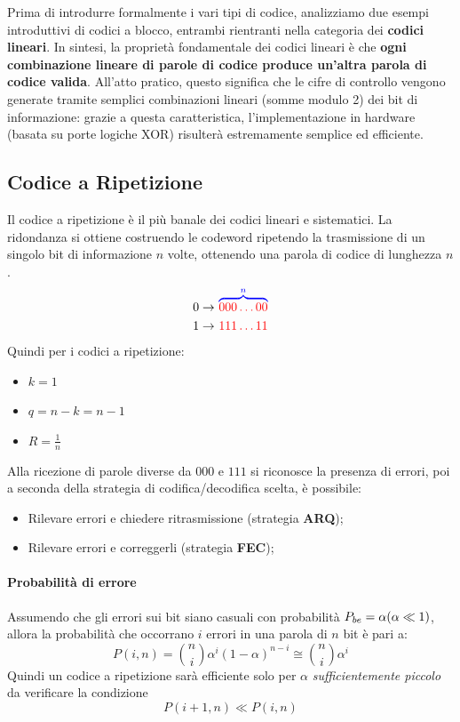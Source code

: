 Prima di introdurre formalmente i vari tipi di codice, analizziamo due esempi introduttivi di codici a blocco, entrambi rientranti nella categoria dei \textbf{codici lineari}. In sintesi, la proprietà fondamentale dei codici lineari è che \textbf{ogni combinazione lineare di parole di codice produce un'altra parola di codice valida}. All'atto pratico, questo significa che le cifre di controllo vengono generate tramite semplici combinazioni lineari (somme modulo 2) dei bit di informazione: grazie a questa caratteristica, l'implementazione in hardware (basata su porte logiche XOR) risulterà estremamente semplice ed efficiente.

\subsection{Codice a Ripetizione}
Il codice a ripetizione è il più banale dei codici lineari e sistematici. La ridondanza si ottiene costruendo le codeword ripetendo  la trasmissione di un singolo bit di informazione $n$ volte, ottenendo una parola di codice di lunghezza $n$.
\begin{align*}
    0 \rightarrow & \ \textcolor{blue}{\overbrace{\textcolor{red}{000\dots00}}^{n}} \\
    1 \rightarrow & \ \textcolor{red}{111\dots11}
\end{align*}
Quindi per i codici a ripetizione:
\begin{itemize}
    \item $k=1$
    \item $q=n-k=n-1$
    \item $R = \frac{1}{n}$
\end{itemize}
Alla ricezione di parole diverse da $000$ e $111$ si riconosce la presenza di errori, poi a seconda della strategia di codifica/decodifica scelta, è possibile:
\begin{itemize}
    \item Rilevare errori e chiedere ritrasmissione (strategia \textbf{ARQ});
    \item Rilevare errori e correggerli (strategia \textbf{FEC});
\end{itemize}

\paragraph{Probabilità di errore}
Assumendo che gli errori sui bit siano casuali con probabilità $P_{be}=\alpha \space (\alpha \ll 1)$, allora la probabilità che occorrano $i$ errori in una parola di $n$ bit è pari a:
\[P(i,n)=\binom{n}{i}\alpha ^i(1- \alpha)^{n-i} \cong \binom{n}{i}\alpha ^i\]
Quindi un codice a ripetizione sarà efficiente solo per $\alpha$ \textit{sufficientemente piccolo} da verificare la condizione
\[P(i+1,n) \ll P(i,n)\]

